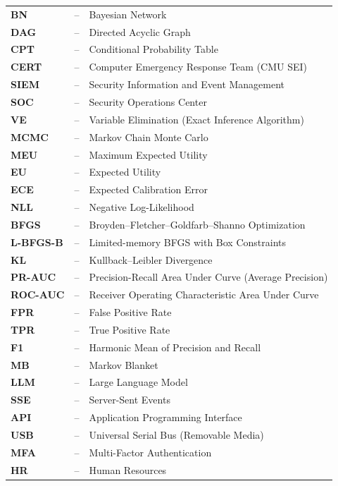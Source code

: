 \documentclass[12pt,a4paper]{report}
\begin{document}
\begin{longtable}{p{} p{} p{}}
\textbf{BN} & -- & Bayesian Network \\
\textbf{DAG} & -- & Directed Acyclic Graph \\
\textbf{CPT} & -- & Conditional Probability Table \\
\textbf{CERT} & -- & Computer Emergency Response Team (CMU SEI) \\
\textbf{SIEM} & -- & Security Information and Event Management \\
\textbf{SOC} & -- & Security Operations Center \\
\textbf{VE} & -- & Variable Elimination (Exact Inference Algorithm) \\
\textbf{MCMC} & -- & Markov Chain Monte Carlo \\
\textbf{MEU} & -- & Maximum Expected Utility \\
\textbf{EU} & -- & Expected Utility \\
\textbf{ECE} & -- & Expected Calibration Error \\
\textbf{NLL} & -- & Negative Log-Likelihood \\
\textbf{BFGS} & -- & Broyden--Fletcher--Goldfarb--Shanno Optimization \\
\textbf{L-BFGS-B} & -- & Limited-memory BFGS with Box Constraints \\
\textbf{KL} & -- & Kullback--Leibler Divergence \\
\textbf{PR-AUC} & -- & Precision-Recall Area Under Curve (Average Precision) \\
\textbf{ROC-AUC} & -- & Receiver Operating Characteristic Area Under Curve \\
\textbf{FPR} & -- & False Positive Rate \\
\textbf{TPR} & -- & True Positive Rate \\
\textbf{F1} & -- & Harmonic Mean of Precision and Recall \\
\textbf{MB} & -- & Markov Blanket \\
\textbf{LLM} & -- & Large Language Model \\
\textbf{SSE} & -- & Server-Sent Events \\
\textbf{API} & -- & Application Programming Interface \\
\textbf{USB} & -- & Universal Serial Bus (Removable Media) \\
\textbf{MFA} & -- & Multi-Factor Authentication \\
\textbf{HR} & -- & Human Resources \\

\end{longtable}
\end{document}
